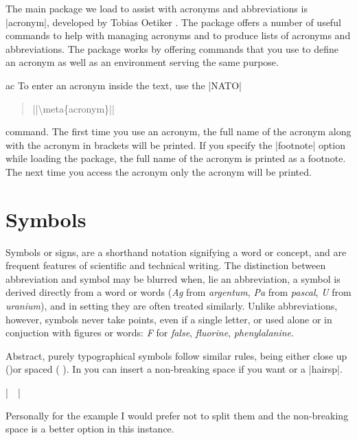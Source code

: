 The main package we load to assist with acronyms and abbreviations is |acronym|, developed by Tobias Oetiker \citeyearpar{acronym}. The package offers a number of useful commands to help with managing acronyms and to produce lists of acronyms and abbreviations. The package works by offering commands that you use to define an acronym as well as an environment serving the same purpose.

\begin{docCommand}{ac}{}
    To enter an acronym inside the text, use the |\ac{NATO}|
\end{docCommand}
    
    \begin{quote}
     |\ac{|\meta{acronym}|}|
    \end{quote}
    command. The first time you use an acronym, the full name of the
    acronym along with the acronym in brackets will be printed. If you
    specify the |footnote| option while loading the package, the full
    name of the acronym is printed as a footnote.
    The next time you access the acronym only the acronym will
    be printed.

\section{Symbols}

Symbols or signs, are a shorthand notation signifying a word or concept, and are frequent features of scientific and technical writing. The distinction between abbreviation and symbol may be blurred when, lie an abbreviation, a symbol is derived directly from a word or words (\textit{Ag} from \textit{argentum}, \textit{Pa} from \textit{pascal}, \textit{U} from \textit{uranium}), and in setting they are often treated similarly. Unlike abbreviations, however, symbols never take points, even if a single letter, or used alone or in conjuction with figures or words: \textit{F}  for \textit{false}, \textit{fluorine}, \textit{phenylalanine}.

Abstract, purely typographical symbols follow similar rules, being either close up ()or spaced (  ). In \latex you can insert a non-breaking space if you want or a |hairsp|.

|~~|

Personally for the example I would prefer not to split them and the non-breaking space is a better option in this instance.

